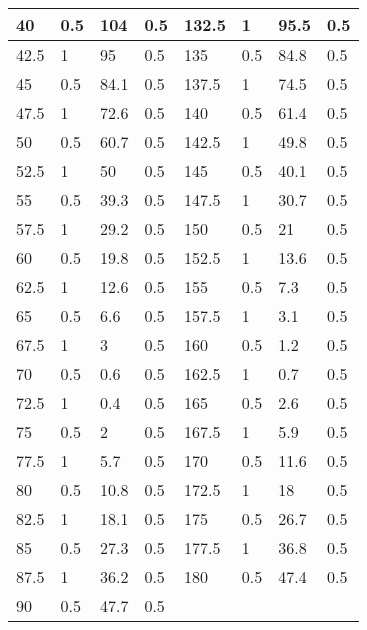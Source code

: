 \begin{table}[h!]
\begin{tabular}{|l|l|l|l||l|l|l|l|}
40    & 0.5         & 104     & 0.5     & 132.5 & 1           & 95.5    & 0.5     \\ \hline
42.5  & 1           & 95      & 0.5     & 135   & 0.5         & 84.8    & 0.5     \\ \hline
45    & 0.5         & 84.1    & 0.5     & 137.5 & 1           & 74.5    & 0.5     \\ \hline
47.5  & 1           & 72.6    & 0.5     & 140   & 0.5         & 61.4    & 0.5     \\ \hline
50    & 0.5         & 60.7    & 0.5     & 142.5 & 1           & 49.8    & 0.5     \\ \hline
52.5  & 1           & 50      & 0.5     & 145   & 0.5         & 40.1    & 0.5     \\ \hline
55    & 0.5         & 39.3    & 0.5     & 147.5 & 1           & 30.7    & 0.5     \\ \hline
57.5  & 1           & 29.2    & 0.5     & 150   & 0.5         & 21      & 0.5     \\ \hline
60    & 0.5         & 19.8    & 0.5     & 152.5 & 1           & 13.6    & 0.5     \\ \hline
62.5  & 1           & 12.6    & 0.5     & 155   & 0.5         & 7.3     & 0.5     \\ \hline
65    & 0.5         & 6.6     & 0.5     & 157.5 & 1           & 3.1     & 0.5     \\ \hline
67.5  & 1           & 3       & 0.5     & 160   & 0.5         & 1.2     & 0.5     \\ \hline
70    & 0.5         & 0.6     & 0.5     & 162.5 & 1           & 0.7     & 0.5     \\ \hline
72.5  & 1           & 0.4     & 0.5     & 165   & 0.5         & 2.6     & 0.5     \\ \hline
75    & 0.5         & 2       & 0.5     & 167.5 & 1           & 5.9     & 0.5     \\ \hline
77.5  & 1           & 5.7     & 0.5     & 170   & 0.5         & 11.6    & 0.5     \\ \hline
80    & 0.5         & 10.8    & 0.5     & 172.5 & 1           & 18      & 0.5     \\ \hline
82.5  & 1           & 18.1    & 0.5     & 175   & 0.5         & 26.7    & 0.5     \\ \hline
85    & 0.5         & 27.3    & 0.5     & 177.5 & 1           & 36.8    & 0.5     \\ \hline
87.5  & 1           & 36.2    & 0.5     & 180   & 0.5         & 47.4    & 0.5     \\ \hline
90    & 0.5         & 47.7    & 0.5     &       &             &         &         \\ \hline
\end{tabular}
\end{table}